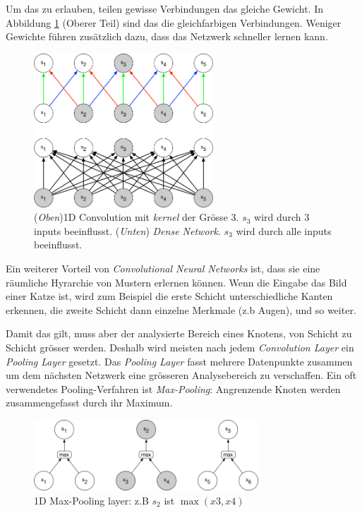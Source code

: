 Um das zu erlauben, teilen gewisse Verbindungen das gleiche Gewicht. In Abbildung \ref{img:conv} (Oberer Teil) sind das die gleichfarbigen Verbindungen. Weniger Gewichte führen zusätzlich dazu, dass das Netzwerk schneller lernen kann.
\begin{figure}[hbt]
	\centering
		\includegraphics[width=0.6\textwidth]{assets/conv_1d.png}
	\caption{(\textit{Oben})1D Convolution mit \textit{kernel} der Grösse 3. $s_3$ wird durch 3 inputs beeinflusst.
		     (\textit{Unten}) \textit{Dense Network}. $s_3$ wird durch alle inputs beeinflusst.\parencite{goodfellow}}
	\label{img:conv}
\end{figure}

Ein weiterer Vorteil von \textit{Convolutional Neural Networks} ist, dass sie eine räumliche Hyrarchie von Mustern erlernen können. Wenn die Eingabe das Bild einer Katze ist, wird zum Beispiel die erste Schicht unterschiedliche Kanten erkennen, die zweite Schicht dann einzelne Merkmale (z.b Augen), und so weiter.

Damit das gilt, muss aber der analysierte Bereich eines Knotens, von Schicht zu Schicht grösser werden. Deshalb wird meisten nach jedem \textit{Convolution Layer} ein \textit{Pooling Layer} gesetzt. Das \textit{Pooling Layer} fasst mehrere Datenpunkte zusammen um dem nächsten Netzwerk eine grösseren Analysebereich zu verschaffen. Ein oft verwendetes Pooling-Verfahren ist \textit{Max-Pooling}: Angrenzende Knoten werden zusammengefasst durch ihr Maximum. 
\begin{figure}[hbt]
	\centering
		\includegraphics[width=0.75\textwidth]{assets/pooling_1d.png}
	\caption{1D Max-Pooling layer: z.B $s_2$ ist $\max (x3, x4)$}
	\label{img:pool}
\end{figure}


